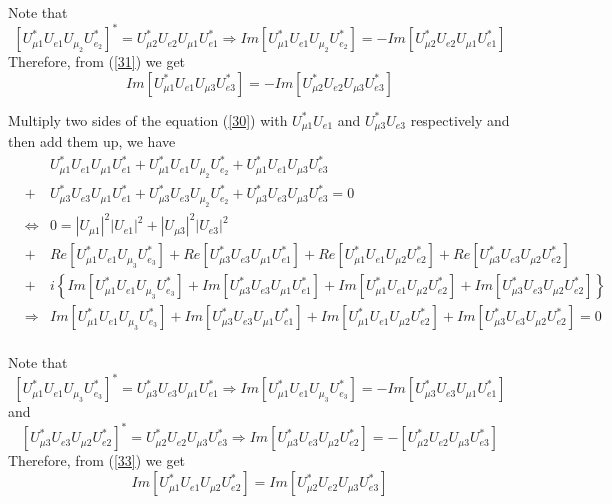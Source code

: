 \documentclass[a4 paper,12pt]{report}%
\begin{document}
Note that $$[U^*_{\mu 1} U_{e1}U_{\mu_2}U^*_{e_2}]^*= U^*_{\mu 2} U_{e2}U_{\mu 1}U^*_{e 1} \Rightarrow Im[U^*_{\mu 1} U_{e1}U_{\mu_2}U^*_{e_2}]=-Im [U^*_{\mu 2} U_{e2}U_{\mu 1}U^*_{e 1}]$$
Therefore, from (\ref{31}) we get
\begin{equation}\label{32}
Im[U^*_{\mu 1} U_{e1}U_{\mu 3}U^*_{e3}] = - Im[U^*_{\mu 2} U_{e2}U_{\mu 3}U^*_{e3}]
\end{equation}\par

Multiply two sides of the equation (\ref{30}) with $U^*_{\mu 1} U_{e1}$ and $U^*_{\mu 3} U_{e3}$ respectively and then add them up, we have
   \begin{eqnarray}\label{33} 
& &U^*_{\mu 1} U_{e1}U_{\mu 1}U^*_{e 1} + U^*_{\mu 1} U_{e1}U_{\mu_2}U^*_{e_2} + U^*_{\mu 1} U_{e1}U_{\mu 3}U^*_{e3}\nonumber \\
 &+ &U^*_{\mu 3} U_{e3}U_{\mu 1}U^*_{e 1} + U^*_{\mu 3} U_{e3}U_{\mu_2}U^*_{e_2} + U^*_{\mu 3} U_{e3}U_{\mu 3}U^*_{e3} = 0 \nonumber\\
&\Leftrightarrow& 0 = |U_{\mu 1}|^2|U_{e1}|^2 + |U_{\mu 3}|^2 |U_{e3}|^2 \nonumber \\ 
&+& Re[U^*_{\mu 1} U_{e1}U_{\mu_3}U^*_{e_3}] + Re[U^*_{\mu 3} U_{e3}U_{\mu 1}U^*_{e 1}] + Re[U^*_{\mu 1} U_{e1}U_{\mu 2}U^*_{e2}] + Re[U^*_{\mu 3} U_{e3}U_{\mu 2}U^*_{e2}] \nonumber \\
&+& i\left\{Im[U^*_{\mu 1} U_{e1}U_{\mu_3}U^*_{e_3}] + Im[U^*_{\mu 3} U_{e3}U_{\mu 1}U^*_{e 1}] + Im[U^*_{\mu 1} U_{e1}U_{\mu 2}U^*_{e2}] + Im[U^*_{\mu 3} U_{e3}U_{\mu 2}U^*_{e2}] \right\} \nonumber \\
&\Rightarrow& Im[U^*_{\mu 1} U_{e1}U_{\mu_3}U^*_{e_3}] + Im[U^*_{\mu 3} U_{e3}U_{\mu 1}U^*_{e 1}] + Im[U^*_{\mu 1} U_{e1}U_{\mu 2}U^*_{e2}] + Im[U^*_{\mu 3} U_{e3}U_{\mu 2}U^*_{e2}] = 0 \nonumber \\
  \end{eqnarray} \par
Note that $$[U^*_{\mu 1} U_{e1}U_{\mu_3}U^*_{e_3}]^*= U^*_{\mu 3} U_{e3}U_{\mu 1}U^*_{e 1} \Rightarrow Im[U^*_{\mu 1} U_{e1}U_{\mu_3}U^*_{e_3}]= - Im[U^*_{\mu 3} U_{e3}U_{\mu 1}U^*_{e 1}]$$ 
 and
$$[U^*_{\mu 3} U_{e3}U_{\mu 2}U^*_{e2}]^* =  U^*_{\mu 2} U_{e2}U_{\mu 3}U^*_{e3} \Rightarrow Im[U^*_{\mu 3} U_{e3}U_{\mu 2}U^*_{e2}] =  - [U^*_{\mu 2} U_{e2}U_{\mu 3}U^*_{e3}]$$
Therefore, from (\ref{33}) we get
\begin{equation}\label{34}
Im[U^*_{\mu 1} U_{e1}U_{\mu 2}U^*_{e2}] = Im[U^*_{\mu 2} U_{e2}U_{\mu 3}U^*_{e3}]
\end{equation}\par
\end{document}
